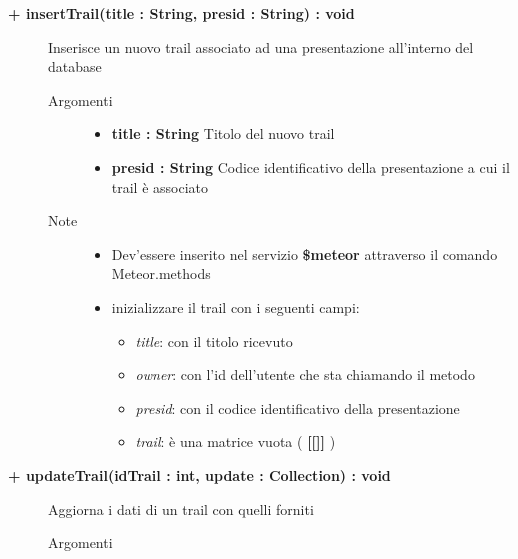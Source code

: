 \begin{description}
	\begin{description}
		\item[\textbf{\color{blue}+ insertTrail(title : String, presid : String) : void			}] \hfill
			Inserisce un nuovo trail associato ad una presentazione all'interno del database
			
		\begin{description}
			\item[Argomenti] \hfill
				\begin{itemize}
				
					\item \textbf{title : String			} \hfill
					Titolo del nuovo trail
					\item \textbf{presid : String			} \hfill
					Codice identificativo della presentazione a cui il trail è associato
					
				\end{itemize}
			\item[Note] \hfill
			\begin{itemize}
					\item Dev'essere inserito nel servizio \textbf{\$meteor} attraverso il comando Meteor.methods
					\item inizializzare il trail con i seguenti campi:
					\begin{itemize}
					\item \textit{title}: con il titolo ricevuto
					\item \textit{owner}: con l'id dell'utente che sta chiamando il metodo
					\item \textit{presid}: con il codice identificativo della presentazione
					\item \textit{trail}: è una matrice vuota ( \textbf{[[]]} )
					\end{itemize}
				\end{itemize}
		\end{description}
	\end{description}
	
	\begin{description}
		\item[\textbf{\color{blue}+ updateTrail(idTrail : int, update : Collection) : void			}] \hfill
			Aggiorna i dati di un trail con quelli forniti
			
		\begin{description}
			\item[Argomenti] \hfill
				\begin{itemize}
				

\end{itemize}
\end{description}
\end{description}
\end{description}
